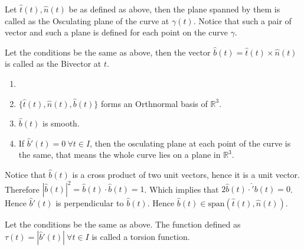 \vspace{0.4cm}
\begin{definition}
    Let $\hat{t}(t), \hat{n}(t)$ be as defined as above, then the plane spanned by them is called as the Osculating plane of the curve at $\gamma(t)$. Notice that such a pair of vector and such a plane is defined for each point on the curve $\gamma$.
\end{definition}
\vspace{0.4cm}
\begin{definition}[Bivector]
    Let the conditions be the same as above, then the vector $\hat{b}(t)=\hat{t}(t)\times\hat{n}(t)$ is called as the Bivector at $t$.
\end{definition}
\vspace{0.4cm}
\begin{remark}
    \begin{enumerate}[label=\roman*.]
        \item [] 
        \item $\{\hat{t}(t),\hat{n}(t),\hat{b}(t)\}$ forms an Orthnormal basis of $\mathbb{R}^{3}$.
        \item $\hat{b}(t)$ is smooth.
        \item If $\hat{b}'(t)=0~\forall t\in I$, then the osculating plane at each point of the curve is the same, that means the whole curve lies on a plane in $\mathbb{R}^{3}$.
    \end{enumerate}
\end{remark}
\vspace{0.4cm}
\begin{note}
    Notice that $\hat{b}(t)$ is a cross product of two unit vectors, hence it is a unit vector.\\ 
    Therefore $|\hat{b}(t)|^{2}=\hat{b}(t)\cdot\hat{b}(t)=1$. Which implies that $2\hat{b}(t)\cdot\hat'{b}(t)=0$. Hence $\hat{b}'(t)$ is perpendicular to $\hat{b}(t)$.
    Hence $\hat{b}(t)\in\text{span}\left(\hat{t}(t),\hat{n}(t)\right)$.
\end{note}
\vspace{0.4cm}
\begin{definition}
    Let the conditions be the same as above. The function defined as $\tau(t)=|\hat{b}'(t)|~\forall t\in I$ is called a torsion function.
\end{definition}
\vspace{0.4cm}
